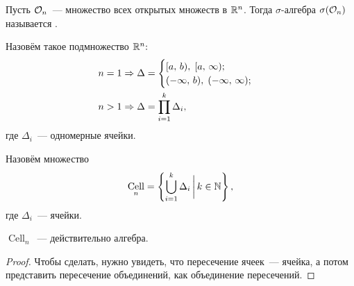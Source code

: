 \documentclass{notes}
\DeclareMathOperator{\Cell}{Cell}
\begin{document}
	\begin{de}
		Пусть $\mathcal{O}_n$~--- множество всех открытых множеств в $\mathbb{R}^n$. Тогда $\sigma$-алгебра $\sigma(\mathcal{O}_n)$ называется .
	\end{de}

	\begin{de}
		Назовём  такое подмножество $\mathbb{R}^n\text{\text{:}}$
		\begin{align*}
			n &= 1 \Rightarrow \Delta = \begin{cases}
				[a, \, b), \; [a, \, \infty)\text{\text{;}} \\
				(-\infty, \, b), \; (-\infty, \, \infty)\text{\text{;}} 
			\end{cases} \\
			n &> 1 \Rightarrow \Delta = \prod_{i = 1}^k \Delta_i,
		\end{align*}
		где $\Delta_i$~--- одномерные ячейки.
	\end{de}

	\begin{de}
		Назовём  множество
		\[
			\Cell_n = \left\{\bigcup_{i = 1}^k \Delta_i \, \bigg| \, k \in \N \right\},
		\]
		где $\Delta_i$~--- ячейки.
	\end{de}

	\begin{st}
		$\Cell_n$~--- действительно алгебра.
		\begin{proof}
			Чтобы сделать, нужно увидеть, что пересечение ячеек~--- ячейка, а потом представить пересечение объединений, как объединение пересечений.
		\end{proof}
	\end{st}
\end{document}
